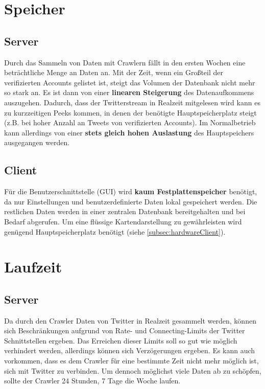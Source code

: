 \section{Speicher}
\subsection{Server}
Durch das Sammeln von Daten mit Crawlern fällt in den ersten Wochen eine beträchtliche Menge an Daten an. Mit der Zeit, wenn ein Großteil der verifizierten Accounts gelistet ist, steigt das Volumen der Datenbank nicht mehr so stark an. Es ist dann von einer \textbf{linearen Steigerung} des Datenaufkommens auszugehen. 
Dadurch, dass der Twitterstream in Realzeit mitgelesen wird kann es zu  kurzzeitigen Peeks kommen, in denen der benötigte Hauptspeicherplatz steigt (z.B. bei hoher Anzahl an Tweets von verifizierten Accounts). Im Normalbetrieb kann allerdings von einer \textbf{stets gleich hohen Auslastung} des Hauptspeichers ausgegangen werden.
\subsection{Client}
Für die Benutzerschnittstelle (GUI) wird \textbf{kaum Festplattenspeicher} benötigt, da nur Einstellungen und benutzerdefinierte Daten lokal gespeichert werden. Die restlichen Daten werden in einer zentralen Datenbank bereitgehalten und bei Bedarf abgerufen.
Um eine flüssige Kartendarstellung zu gewährleisten wird genügend Hauptspeicherplatz benötigt (siehe \ref{subsec:hardwareClient}).
\section{Laufzeit}
\subsection{Server}
Da durch den Crawler Daten von Twitter in Realzeit gesammelt werden, können sich Beschränkungen aufgrund von Rate- und Connecting-Limits der Twitter Schnittstellen ergeben. Das Erreichen dieser Limits soll so gut wie möglich verhindert werden, allerdings können sich Verzögerungen ergeben. Es kann auch vorkommen, dass es dem Crawler für eine bestimmte Zeit nicht mehr möglich ist, sich mit Twitter zu verbinden. Um dennoch möglichst viele Daten ab zu schöpfen, sollte der Crawler 24 Stunden, 7 Tage die Woche laufen.
